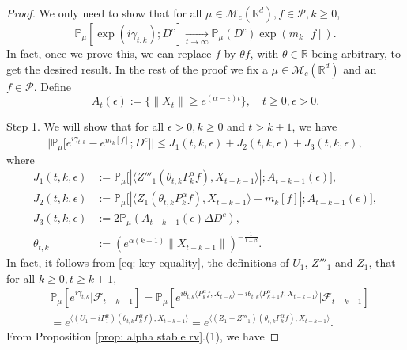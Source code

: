 \documentclass[12pt,a4paper]{amsart}
\theoremstyle{plain}
\theoremstyle{definition}
\numberwithin{equation}{section}
\begin{document}
\begin{proof}
  We only need to show that for all $\mu \in \mathcal M_c(\mathbb R^d), f\in \mathcal P, k \geq 0$,
\begin{equation}
  \mathbb{P}_{\mu}[\exp(i\gamma_{t,k}); D^c]
  \xrightarrow[t\rightarrow \infty]{}\mathbb{P}_{\mu}(D^c)\exp(m_k[f]).
\end{equation}
In fact, once we prove this, we can replace $f$ by $\theta f$, with $\theta \in \mathbb R$ being  arbitrary,  to get the desired result.
In the rest of the proof we fix a $\mu \in \mathcal M_c(\mathbb R^d)$ and an $f\in \mathcal P$.
Define
\[
  A_t(\epsilon)
  :=\{ \|X_t\| \geq e^{(\alpha - \epsilon)t} \},
  \quad t\geq 0, \epsilon > 0.
\]

Step 1. We will show that for all $\epsilon > 0, k\geq 0$ and $t>k+1$, we have
\begin{equation}
  \big|\mathbb{P}_{\mu}\big[e^{i\gamma_{t,k}}-e^{m_k[f]}; D^c\big]\big|
  \leq J_1(t,k,\epsilon)+J_2(t,k,\epsilon)+J_3(t,k,\epsilon),
\end{equation}
where
\begin{align}
\label{eq: Def of Ji}
  J_1(t,k,\epsilon)
  & := \mathbb{P}_{\mu}\big[|\langle Z'''_1(\theta_{t,k}P^\alpha_k f), X_{t-k-1}\rangle|; A_{t-k-1}(\epsilon) \big],
  \\ J_2(t,k,\epsilon)
  & := \mathbb{P}_{\mu}\big[|\langle Z_1(\theta_{t,k}P^\alpha_k f),X_{t-k-1}\rangle-m_k[f]|; A_{t-k-1}(\epsilon)\big],
  \\ J_3(t,k, \epsilon)
  & :=2\mathbb{P}_{\mu}(A_{t-k-1}(\epsilon)\Delta D^c),
  \\ \theta_{t,k}
  & := (e^{\alpha( k+1)}\|X_{t-k-1}\|)^{-\frac{1}{1+\beta}}.
\end{align}
In fact, it follows from \eqref{eq: key equality}, the definitions of $U_1$, $Z'''_1$ and $Z_1$, that for all $k\geq 0, t\geq k+1$,
\begin{align}
  \label{eq: need1}
  & \mathbb{P}_{\mu}[e^{i\gamma_{t,k}}|\mathscr{F}_{t-k-1}]
    =\mathbb{P}_{\mu}[e^{i\theta_{t,k}\langle P^\alpha_k f,X_{t-k}\rangle-i\theta_{t,k}\langle P^\alpha_{k+1} f, X_{t-k-1}\rangle}|\mathscr{F}_{t-k-1}] \\
  & =e^{\langle (U_1 - iP^\alpha_1 ) (\theta_{t,k}P^\alpha_k f),X_{t-k-1}\rangle}
    =e^{\langle (Z_1 + Z'''_1) (\theta_{t,k}P^\alpha_k f),X_{t-k-1}\rangle}.
\end{align}
From Proposition \ref{prop: alpha stable rv}.(1), we have

\end{proof}
\end{document}

